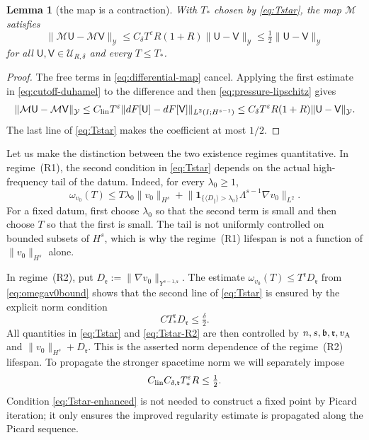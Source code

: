 \documentclass[11pt,reqno]{amsart}
\theoremstyle{plain}
\newtheorem{lemma}[theorem]{Lemma}
\theoremstyle{definition}
\theoremstyle{remark}
\numberwithin{equation}{section}
\newcommand{\breg}{\mathfrak b}
\newcommand{\rpar}{\mathfrak r}
\newcommand{\Ufield}{\mathsf U}
\newcommand{\Vfield}{\mathsf V}
\begin{document}
\begin{lemma}[the map is a contraction]\label{lem:contraction}
With $T_*$ chosen by \eqref{eq:Tstar}, the map $\mathcal M$ satisfies
\begin{equation}\label{eq:map-contraction}
 \|\mathcal M\Ufield-\mathcal M\Vfield\|_{\mathcal Y}
 \le C_\delta T^\varepsilon R(1+R)
       \|\Ufield-\Vfield\|_{\mathcal Y}
 \le\tfrac12\|\Ufield-\Vfield\|_{\mathcal Y}
\end{equation}
for all $\Ufield,\Vfield\in\mathcal U_{R,\delta}$ and every $T\le T_*$.
\end{lemma}

\begin{proof}
The free terms in \eqref{eq:differential-map} cancel. Applying the first
estimate in \eqref{eq:cutoff-duhamel} to the difference and then
\eqref{eq:pressure-lipschitz} gives
\[
 \|\mathcal M\Ufield-\mathcal M\Vfield\|_{\mathcal Y}
 \le C_{\rm lin}T^\varepsilon
 \|dF[\Ufield]-dF[\Vfield]\|_{L^2(I;H^{s-1})}
 \le C_\delta T^\varepsilon R(1+R)
       \|\Ufield-\Vfield\|_{\mathcal Y}.
\]
The last line of \eqref{eq:Tstar} makes the coefficient at most $1/2$.
\end{proof}

Let us make the distinction between the two existence regimes quantitative.
In regime~\textup{(R1)}, the second condition in \eqref{eq:Tstar} depends on the
actual high-frequency tail of the datum.  Indeed, for every $\lambda_0\ge1$,
\[
 \omega_{v_0}(T)
 \le T\lambda_0 \|v_0\|_{H^{s}}
 +\big\|\mathbf 1_{\{\langle D_{\parallel}\rangle>\lambda_0\}}
       \Lambda^{s-1}\nabla v_0\big\|_{L^2}.
\]
For a fixed datum, first choose $\lambda_0$ so that the second term is small and
then choose $T$ so that the first is small.  The tail is not uniformly
controlled on bounded subsets of $H^s$, which is why the regime~\textup{(R1)}
lifespan is not a function of $\|v_0\|_{H^s}$ alone.

In regime~\textup{(R2)}, put
$D_{\rpar}:=\|\nabla v_0\|_{Y^{s-1,\rpar}}$.  The estimate
$\omega_{v_0}(T)\le T^{\rpar}D_{\rpar}$ from \eqref{eq:omegav0bound} shows that the second line of
\eqref{eq:Tstar} is ensured by the explicit norm condition
\begin{equation}\label{eq:Tstar-R2}
 CT_*^{\rpar}D_{\rpar}\le\tfrac\delta2.
\end{equation}
All quantities in \eqref{eq:Tstar} and \eqref{eq:Tstar-R2} are then controlled
by $n,s,\breg,\rpar,v_{\rm A}$ and
$\|v_0\|_{H^s}+D_{\rpar}$.  This is the asserted norm dependence of the
regime~\textup{(R2)} lifespan.  To propagate the stronger spacetime norm we
will separately impose
\begin{equation}\label{eq:Tstar-enhanced}
 C_{\rm lin}C_{\delta,\rpar}T_*^\varepsilon R\le\tfrac12.
\end{equation}
Condition \eqref{eq:Tstar-enhanced} is not needed to construct a fixed point by Picard iteration; it only ensures the improved regularity estimate is propagated along the Picard sequence.
\end{document}

